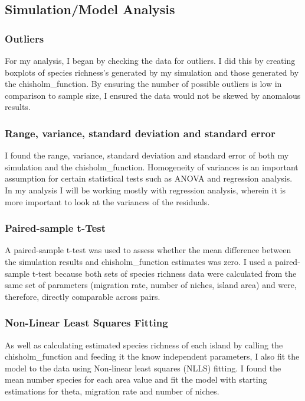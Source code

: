 \documentclass{article}
\begin{document}
\subsection{Simulation/Model Analysis}

\subsubsection{Outliers}
For my analysis, I began by checking the data for outliers. I did this by creating boxplots of species richness’s generated by my simulation and those generated by the chisholm\_function. By ensuring the number of possible outliers is low in comparison to sample size, I ensured the data would not be skewed by anomalous results.

\subsubsection{Range, variance, standard deviation and standard error}
I found the range, variance, standard deviation and standard error of both my simulation and the chisholm\_function. Homogeneity of variances is an important assumption for certain statistical tests such as ANOVA and regression analysis. In my analysis I will be working mostly with regression analysis, wherein it is more important to look at the variances of the residuals. 

\subsubsection{Paired-sample t-Test}
A paired-sample t-test was used to assess whether the mean difference between the simulation results and chisholm\_function estimates was zero. I used a paired-sample t-test because both sets of species richness data were calculated from the same set of parameters (migration rate, number of niches, island area) and were, therefore, directly comparable across pairs. 

\subsubsection{Non-Linear Least Squares Fitting}
As well as calculating estimated species richness of each island by calling the chisholm\_function and feeding it the know independent parameters, I also fit the model to the data using Non-linear least squares (NLLS) fitting. I found the mean number species for each area value and fit the model with starting estimations for theta, migration rate and number of niches. 
\end{document}
